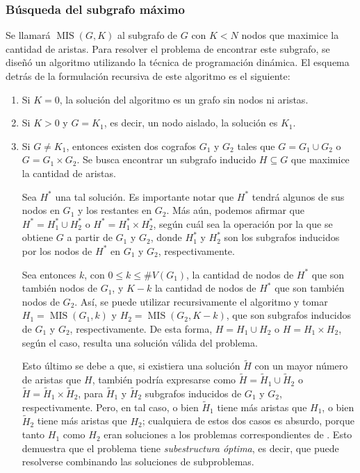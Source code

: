 \subsubsection{Búsqueda del subgrafo máximo}
Se llamará $\operatorname{MIS}(G, K)$ al subgrafo de $G$ con $K < N$ nodos que
maximice la cantidad de aristas. Para resolver el problema de encontrar este
subgrafo, se diseñó un algoritmo utilizando la técnica de programación
dinámica. El esquema detrás de la formulación recursiva de este algoritmo es
el siguiente:

\begin{enumerate}
    \item Si $K = 0$, la solución del algoritmo es un grafo sin nodos ni
    aristas.
    \item Si $K > 0$ y $G = K_1$, es decir, un nodo aislado, la solución es
    $K_1$.
    \item Si $G \neq K_1$, entonces existen dos cografos $G_1$ y $G_2$ tales
    que $G = G_1 \cup G_2$ o $G = G_1 \times G_2$. Se busca encontrar un
    subgrafo inducido $H \subseteq G$ que maximice la cantidad de aristas.

    Sea $H^*$ una tal solución. Es importante notar que $H^*$ tendrá
    algunos de sus nodos en $G_1$ y los restantes en $G_2$. Más aún,
    podemos afirmar que $H^* = H^*_1 \cup H^*_2$ o $H^* = H^*_1 \times
    H^*_2$, según cuál sea la operación por la que se obtiene $G$ a partir de
    $G_1$ y $G_2$, donde $H^*_1$ y $H^*_2$ son los subgrafos inducidos por los
    nodos de $H^*$ en $G_1$ y $G_2$, respectivamente.

    Sea entonces $k$, con $0 \leq k \leq \#V(G_1)$, la cantidad de nodos de
    $H^*$ que son también nodos de $G_1$, y $K - k$ la cantidad de nodos de
    $H^*$ que son también nodos de $G_2$. Así, se puede utilizar
    recursivamente el algoritmo y tomar $H_1 = \operatorname{MIS}(G_1, k)$ y
    $H_2 = \operatorname{MIS}(G_2, K - k)$, que son subgrafos inducidos de
    $G_1$ y $G_2$, respectivamente. De esta forma, $H = H_1 \cup H_2$ o $H =
    H_1 \times H_2$, según el caso, resulta una solución válida del problema.

    Esto último se debe a que, si existiera una solución $\tilde{H}$ con un
    mayor número de aristas que $H$, también podría expresarse como $\tilde{H}
    = \tilde{H}_1 \cup \tilde{H}_2$ o $\tilde{H} = \tilde{H}_1 \times \tilde
    {H}_2$, para $\tilde{H}_1$ y $\tilde{H}_2$ subgrafos inducidos de $G_1$ y
    $G_2$, respectivamente. Pero, en tal caso, o bien $\tilde{H}_1$ tiene más
    aristas que $H_1$, o bien $\tilde{H}_2$ tiene más aristas que $H_2$;
    cualquiera de estos dos casos es absurdo, porque tanto $H_1$ como $H_2$
    eran soluciones a los problemas correspondientes de . Esto
    demuestra que el problema tiene \emph{subestructura óptima}, es decir, que
    puede resolverse combinando las soluciones de subproblemas.


\end{enumerate}

